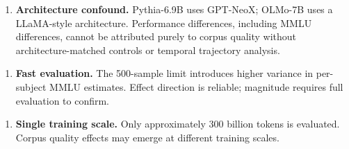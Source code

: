 \begin{enumerate}
\item \textbf{Architecture confound.} Pythia-6.9B uses GPT-NeoX; OLMo-7B uses a LLaMA-style architecture. Performance differences, including MMLU differences, cannot be attributed purely to corpus quality without architecture-matched controls or temporal trajectory analysis.
\end{enumerate}

\begin{enumerate}
\item \textbf{Fast evaluation.} The 500-sample limit introduces higher variance in per-subject MMLU estimates. Effect direction is reliable; magnitude requires full evaluation to confirm.
\end{enumerate}

\begin{enumerate}
\item \textbf{Single training scale.} Only approximately 300 billion tokens is evaluated. Corpus quality effects may emerge at different training scales.
\end{enumerate}


